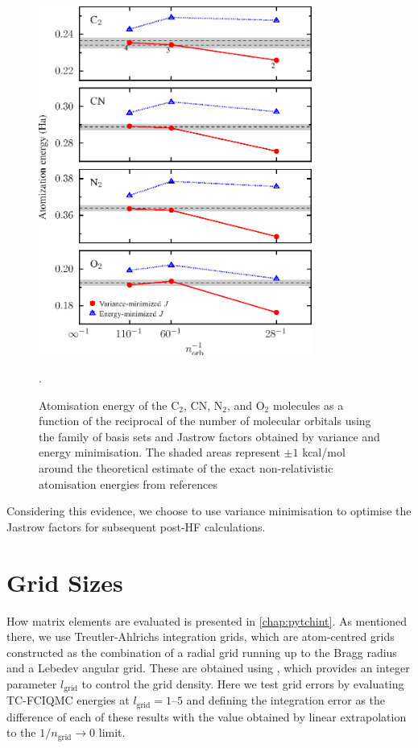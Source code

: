 \begin{figure}[htbp]
    \centering
    \includegraphics[width=0.8\textwidth]{figures/optimisation/Fig/bsdep-dimers-emin}
    \caption{Atomisation energy of the C$_2$, CN, N$_2$, and O$_2$ molecules as a function of the reciprocal of the number of molecular orbitals using the  family of basis sets and Jastrow factors obtained by variance and energy minimisation. The shaded areas represent $\pm 1$ kcal/mol around the theoretical estimate of the exact non-relativistic atomisation energies from references \parencite{fellerSurvey2008,bytautasCorrelation2005}}.
    \label{fig:bsdep-dimers-emin}
\end{figure}

Considering this evidence, we choose to use variance minimisation to optimise the Jastrow factors for subsequent post-HF calculations.

\section{Grid Sizes}

How matrix elements are evaluated is presented in \autoref{chap:pytchint}. As mentioned there, we use Treutler-Ahlrichs integration grids,
\supercite{beckeMulticenter1988,treutlerEfficient1995} which are atom-centred
grids constructed as the combination of a radial grid running up to
the Bragg radius and a Lebedev angular grid. These are obtained using \pyscf, which provides an integer parameter $l_\mathrm{grid}$ to control the grid density. Here we test grid errors by evaluating TC-FCIQMC energies at $l_\mathrm{grid}=1$--$5$ and defining the integration error as the difference of each of these results with the value obtained by linear extrapolation to the $1/n_\mathrm{grid}\to 0$ limit.

